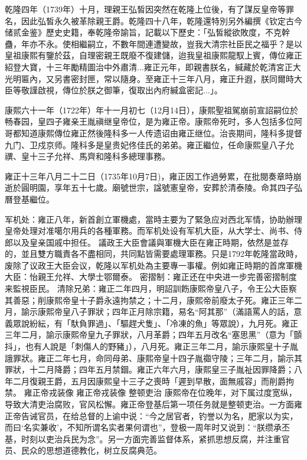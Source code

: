 乾隆四年（1739年）十月，理親王弘皙因突然在乾隆上位後，有了謀反皇帝等罪名，因此弘皙永久被革除親王爵。乾隆四十八年，乾隆還特別另外編撰《钦定古今储贰金鉴》歷史史籍，奉乾隆帝諭旨，記載以下歷史：「弘皙縱欲敗度，不克幹蠱，年亦不永。使相繼嗣立，不數年間連遭變故，豈我大清宗社臣民之福乎？是以皇祖康熙有鑒於茲，自理密親王既廢不復建儲，迨我皇祖康熙龍馭上賓，傳位雍正紹登大寶，十三年勵精圖治中外肅清...雍正元年，即親書朕名，緘藏於乾清宮正大光明匾內，又另書密封匣，常以隨身。至雍正十三年八月，雍正升遐，朕同爾時大臣等敬謹啟視，傳位於朕之御筆，復取出內府緘盒密記...」。

康熙六十一年（1722年）年十一月初七（12月14日），康熙聖祖駕崩前宣詔嗣位於畅春园，皇四子雍亲王胤禛继皇帝位，是为雍正帝。康熙帝死时，多人包括多位阿哥都知道康熙傳位雍正然後隆科多一人传遗诏由雍正继位。治丧期间，隆科多提督九门、卫戍京师。隆科多是皇贵妃佟佳氏的弟弟。雍正繼位，任命康熙皇八子允禩、皇十三子允祥、馬齊和隆科多總理事務。

雍正十三年八月二十二日（1735年10月7日)，雍正因工作過勞累，在批閱奏章時崩逝於圓明園，享年五十七歲。廟號世宗，諡號憲皇帝，安葬於清泰陵。命其四子弘曆登基繼位。

军机处：雍正八年，新首創立軍機處，當時主要为了緊急应对西北军情，协助辦理皇帝处理对准噶尔用兵的各種軍務。而军机处设有军机大臣，从大学士、尚书、侍郎以及皇亲国戚中担任。 議政王大臣會議與軍機大臣在雍正時期，依然是並存的，並且雙方職責各不盡相同，共同點皆需要處理軍務。只是1792年乾隆當政時，废除了议政王大臣会议，乾隆以军机处為主要專一事權。例如雍正時期的首席軍機大臣：怡親王允祥、大學士鄂爾泰。
密摺制：雍正还在中央进一步完善密摺制度来監視臣民。
清除兄弟：雍正二年四月，明詔訓飭康熙帝皇八子，令王公大臣察其善惡；削康熙帝皇十子爵永遠拘禁之；十二月，康熙帝前廢太子死。雍正三年二月，諭示康熙帝皇八子罪狀；四年正月除宗籍，易名“阿其那”（滿語罵人的話，意義眾說紛紜，有「馱負罪過」、「驅趕犬隻」、「冷凍的魚」等眾說），九月死。雍正三年二月，諭示康熙帝皇九子罪狀，八月革爵；四年五月改名“塞思黑”（意为「顫抖」，也有人說是「刺傷人的野豬」），八月死。雍正三年二月，諭示康熙皇十子胤誐罪狀。雍正二年七月，命同母弟、康熙帝皇十四子胤禵守陵；三年二月，諭示其罪狀，十二月降爵；四年五月禁錮。雍正六年六月，康熙皇三子胤祉因罪降爵；八年二月復親王爵，五月因康熙皇十三子之喪時「遲到早散，面無戚容」而削爵拘禁。
雍正帝戎装像
雍正帝戎装像
整顿吏治
康熙帝在位晚年，对下属过度宽纵，导致大清吏治腐败，官风松懈。雍正帝登基后第一项任务就是整顿吏治。一方面雍正帝告诫官员，在给总督的上谕中说：“今之居官者，钓誉以为名，肥家以为实，而曰‘名实兼收’，不知所谓名实者果何谓也”，登极一周年时又说到：“朕缵承丕基，时刻以吏治兵民为念”。另一方面完善监督体系，紧抓思想反腐，并注重官员、民众的思想道德教化，树立反腐典范。

